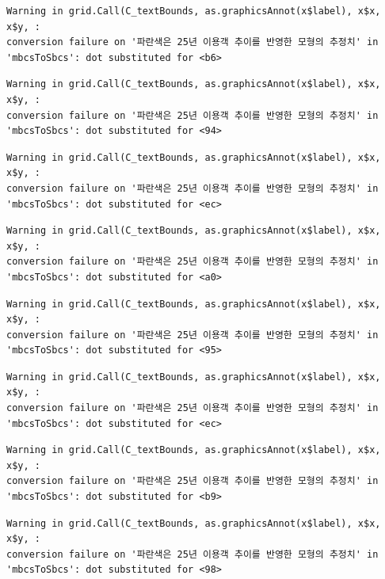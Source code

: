\documentclass[
  letterpaper,
  DIV=11,
  numbers=noendperiod]{scrreprt}
\begin{document}
\begin{verbatim}
Warning in grid.Call(C_textBounds, as.graphicsAnnot(x$label), x$x, x$y, :
conversion failure on '파란색은 25년 이용객 추이를 반영한 모형의 추정치' in
'mbcsToSbcs': dot substituted for <b6>
\end{verbatim}

\begin{verbatim}
Warning in grid.Call(C_textBounds, as.graphicsAnnot(x$label), x$x, x$y, :
conversion failure on '파란색은 25년 이용객 추이를 반영한 모형의 추정치' in
'mbcsToSbcs': dot substituted for <94>
\end{verbatim}

\begin{verbatim}
Warning in grid.Call(C_textBounds, as.graphicsAnnot(x$label), x$x, x$y, :
conversion failure on '파란색은 25년 이용객 추이를 반영한 모형의 추정치' in
'mbcsToSbcs': dot substituted for <ec>
\end{verbatim}

\begin{verbatim}
Warning in grid.Call(C_textBounds, as.graphicsAnnot(x$label), x$x, x$y, :
conversion failure on '파란색은 25년 이용객 추이를 반영한 모형의 추정치' in
'mbcsToSbcs': dot substituted for <a0>
\end{verbatim}

\begin{verbatim}
Warning in grid.Call(C_textBounds, as.graphicsAnnot(x$label), x$x, x$y, :
conversion failure on '파란색은 25년 이용객 추이를 반영한 모형의 추정치' in
'mbcsToSbcs': dot substituted for <95>
\end{verbatim}

\begin{verbatim}
Warning in grid.Call(C_textBounds, as.graphicsAnnot(x$label), x$x, x$y, :
conversion failure on '파란색은 25년 이용객 추이를 반영한 모형의 추정치' in
'mbcsToSbcs': dot substituted for <ec>
\end{verbatim}

\begin{verbatim}
Warning in grid.Call(C_textBounds, as.graphicsAnnot(x$label), x$x, x$y, :
conversion failure on '파란색은 25년 이용객 추이를 반영한 모형의 추정치' in
'mbcsToSbcs': dot substituted for <b9>
\end{verbatim}

\begin{verbatim}
Warning in grid.Call(C_textBounds, as.graphicsAnnot(x$label), x$x, x$y, :
conversion failure on '파란색은 25년 이용객 추이를 반영한 모형의 추정치' in
'mbcsToSbcs': dot substituted for <98>
\end{verbatim}
\end{document}
